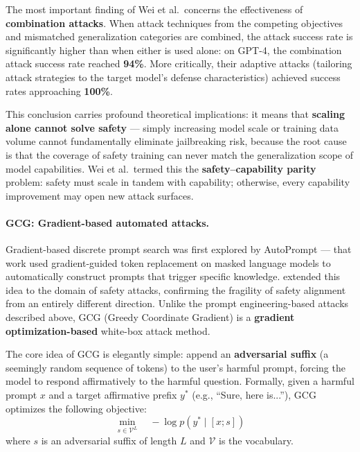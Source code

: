\begin{problembox}
The most important finding of Wei et al.\ concerns the effectiveness of \textbf{combination attacks}.
When attack techniques from the competing objectives and mismatched generalization categories are combined,
the attack success rate is significantly higher than when either is used alone:
on GPT-4, the combination attack success rate reached \textbf{94\%}.
More critically, their adaptive attacks (tailoring attack strategies to the target model's defense characteristics)
achieved success rates approaching \textbf{100\%}.
\end{problembox}

\noindent
This conclusion carries profound theoretical implications:
it means that \textbf{scaling alone cannot solve safety} ---
simply increasing model scale or training data volume cannot fundamentally eliminate jailbreaking risk,
because the root cause is that the coverage of safety training can never match the generalization scope of model capabilities.
Wei et al.\ termed this the \textbf{safety--capability parity} problem:
safety must scale in tandem with capability; otherwise, every capability improvement may open new attack surfaces.

\paragraph{GCG: Gradient-based automated attacks.}
Gradient-based discrete prompt search was first explored by
AutoPrompt \citep{shin2020autoprompt} ---
that work used gradient-guided token replacement on masked language models
to automatically construct prompts that trigger specific knowledge.
 extended this idea to the domain of safety attacks,
confirming the fragility of safety alignment from an entirely different direction.
Unlike the prompt engineering-based attacks described above,
GCG (Greedy Coordinate Gradient) is a \textbf{gradient optimization-based} white-box attack method.

The core idea of GCG is elegantly simple: append an
\textbf{adversarial suffix} (a seemingly random sequence of tokens) to the user's harmful prompt,
forcing the model to respond affirmatively to the harmful question.
Formally, given a harmful prompt $x$ and a target affirmative prefix $y^*$
(e.g., ``Sure, here is...''), GCG optimizes the following objective:
\begin{equation}
  \min_{s \in \mathcal{V}^L} \quad -\log p(y^* \mid [x; s])
  \label{eq:gcg-obj}
\end{equation}
where $s$ is an adversarial suffix of length $L$ and $\mathcal{V}$ is the vocabulary.

